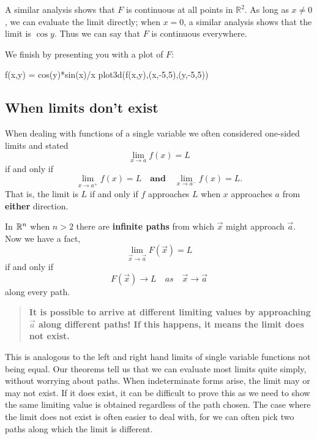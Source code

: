 \documentclass{ximera}
\begin{document}
\begin{example}
\begin{explanation}
    A similar analysis shows that $F$ is continuous at all points in
    $\mathbb{R}^2$. As long as $x\neq0$, we can evaluate the limit
    directly; when $x=0$, a similar analysis shows that the limit is $\cos
    y$. Thus we can say that $F$ is continuous everywhere.
    \begin{onlineOnly}
      We finish by presenting you with a plot of $F$:
\begin{sageCell}
f(x,y) = cos(y)*sin(x)/x
plot3d(f(x,y),(x,-5,5),(y,-5,5))
\end{sageCell}
    \end{onlineOnly}
  \end{explanation}
\end{example}


\subsection{When limits don't exist}

When dealing with functions of a single variable we often considered
one-sided limits and stated
\[
\lim_{x\to a}f(x) = L
\]
if and only if
\[
\lim_{x\to a^+}f(x) =L \quad\textbf{and}\quad \lim_{x\to a^-}f(x) =L.
\]
That is, the limit is $L$ if and only if $f$ approaches $L$ when
$x$ approaches $a$ from \textbf{either} direction.

In $\mathbb R^n$ when $n>2$ there are \textbf{infinite paths} from which
$\vec{x}$ might approach $\vec{a}$. Now we have a fact, 
\[
\lim_{\vec{x}\to \vec{a}}F(\vec{x}) = L
\]
if and only if
\[
F(\vec{x})\to  L \quad{as}\quad \vec{x}\to \vec{a}
\]
along every path.
\begin{quote}
  \textbf{It is possible to arrive at different limiting values by
    approaching $\vec{a}$ along different paths! If this happens, it
    means the limit does not exist.}
\end{quote}
This is analogous to the left and right hand limits of single variable
functions not being equal.  Our theorems tell us that we can evaluate
most limits quite simply, without worrying about paths. When
indeterminate forms arise, the limit may or may not exist. If it does
exist, it can be difficult to prove this as we need to show the same
limiting value is obtained regardless of the path chosen.  The case
where the limit does not exist is often easier to deal with, for we
can often pick two paths along which the limit is different.
\end{document}
